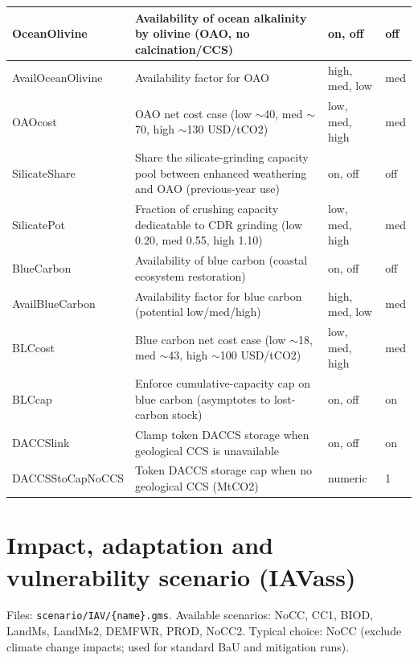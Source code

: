 \documentclass[10pt,a4paper,titlepage,dvipdfmx]{book}
\begin{document}
\begin{longtable}{|p{}|p{}|p{}|p{}|}
OceanOlivine & Availability of ocean alkalinity by olivine (OAO, no calcination/CCS) & on, off & off \\ \hline
AvailOceanOlivine & Availability factor for OAO & high, med, low & med \\ \hline
OAOcost & OAO net cost case (low $\sim$40, med $\sim$70, high $\sim$130 USD/tCO2) & low, med, high & med \\ \hline
SilicateShare & Share the silicate-grinding capacity pool between enhanced weathering and OAO (previous-year use) & on, off & off \\ \hline
SilicatePot & Fraction of crushing capacity dedicatable to CDR grinding (low 0.20, med 0.55, high 1.10) & low, med, high & med \\ \hline
BlueCarbon & Availability of blue carbon (coastal ecosystem restoration) & on, off & off \\ \hline
AvailBlueCarbon & Availability factor for blue carbon (potential low/med/high) & high, med, low & med \\ \hline
BLCcost & Blue carbon net cost case (low $\sim$18, med $\sim$43, high $\sim$100 USD/tCO2) & low, med, high & med \\ \hline
BLCcap & Enforce cumulative-capacity cap on blue carbon (asymptotes to lost-carbon stock) & on, off & on \\ \hline
DACCSlink & Clamp token DACCS storage when geological CCS is unavailable & on, off & on \\ \hline
DACCSStoCapNoCCS & Token DACCS storage cap when no geological CCS (MtCO2) & numeric & 1 \\ \hline
\end{longtable}

\section{Impact, adaptation and vulnerability scenario (IAVass)}

Files: \texttt{scenario/IAV/\{name\}.gms}. Available scenarios: NoCC, CC1, BIOD,
LandMs, LandMs2, DEMFWR, PROD, NoCC2. Typical choice: NoCC (exclude climate
change impacts; used for standard BaU and mitigation runs).
\end{document}
